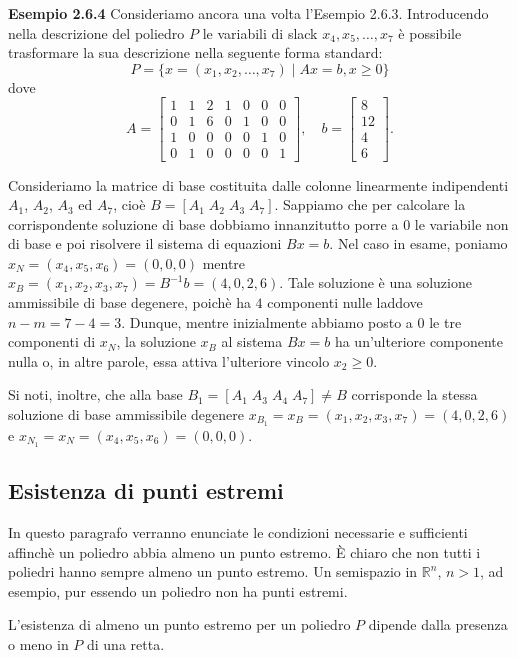 \textbf{Esempio 2.6.4} Consideriamo ancora una volta l'Esempio 2.6.3. Introducendo nella descrizione del poliedro $P$ le variabili di slack $x_4, x_5, \dots, x_7$ è possibile trasformare la sua descrizione nella seguente forma standard:
\[
P = \{x = (x_1, x_2, \dots, x_7) \mid Ax = b, x \ge 0\}
\]
dove
\[
A = \begin{bmatrix}
1 & 1 & 2 & 1 & 0 & 0 & 0 \\
0 & 1 & 6 & 0 & 1 & 0 & 0 \\
1 & 0 & 0 & 0 & 0 & 1 & 0 \\
0 & 1 & 0 & 0 & 0 & 0 & 1
\end{bmatrix}, \quad
b = \begin{bmatrix}
8 \\
12 \\
4 \\
6
\end{bmatrix}.
\]

Consideriamo la matrice di base costituita dalle colonne linearmente indipendenti $A_1$, $A_2$, $A_3$ ed $A_7$, cioè $B = [A_1 \; A_2 \; A_3 \; A_7]$. Sappiamo che per calcolare la corrispondente soluzione di base dobbiamo innanzitutto porre a $0$ le variabile non di base e poi risolvere il sistema di equazioni $Bx=b$. Nel caso in esame, poniamo $x_N = (x_4, x_5, x_6) = (0, 0, 0)$ mentre $x_B = (x_1, x_2, x_3, x_7) = B^{-1}b = (4, 0, 2, 6)$. Tale soluzione è una soluzione ammissibile di base degenere, poichè ha $4$ componenti nulle laddove $n-m = 7-4=3$. Dunque, mentre inizialmente abbiamo posto a $0$ le tre componenti di $x_N$, la soluzione $x_B$ al sistema $Bx=b$ ha un'ulteriore componente nulla o, in altre parole, essa attiva l'ulteriore vincolo $x_2 \ge 0$.

Si noti, inoltre, che alla base $B_1 = [A_1 \; A_3 \; A_4 \; A_7] \neq B$ corrisponde la stessa soluzione di base ammissibile degenere $x_{B_1} = x_B = (x_1, x_2, x_3, x_7) = (4, 0, 2, 6)$ e $x_{N_1} = x_N = (x_4, x_5, x_6) = (0, 0, 0)$.

\subsection{Esistenza di punti estremi}
In questo paragrafo verranno enunciate le condizioni necessarie e sufficienti affinchè un poliedro abbia almeno un punto estremo. È chiaro che non tutti i poliedri hanno sempre almeno un punto estremo. Un semispazio in $\mathbb{R}^{n}$, $n>1$, ad esempio, pur essendo un poliedro non ha punti estremi.

L'esistenza di almeno un punto estremo per un poliedro $P$ dipende dalla presenza o meno in $P$ di una retta.

